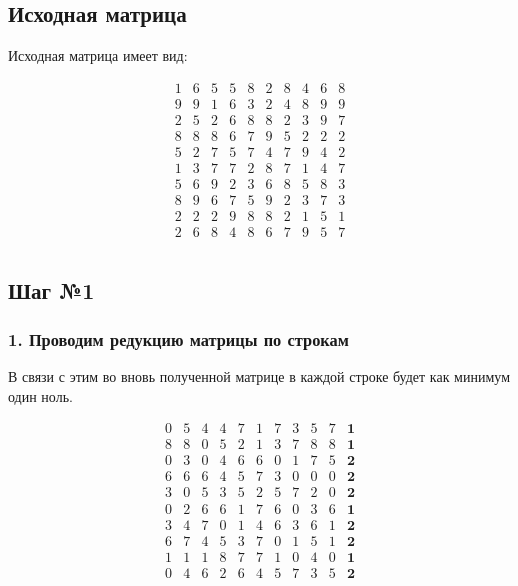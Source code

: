 \documentclass[17pt]{extarticle}
\begin{document}
\subsection*{Исходная матрица}

Исходная матрица имеет вид:

\[
    \begin{array}{*{10}{c}}
        1 & 6 & 5 & 5 & 8 & 2 & 8 & 4 & 6 & 8 \\
        9 & 9 & 1 & 6 & 3 & 2 & 4 & 8 & 9 & 9 \\
        2 & 5 & 2 & 6 & 8 & 8 & 2 & 3 & 9 & 7 \\
        8 & 8 & 8 & 6 & 7 & 9 & 5 & 2 & 2 & 2 \\
        5 & 2 & 7 & 5 & 7 & 4 & 7 & 9 & 4 & 2 \\
        1 & 3 & 7 & 7 & 2 & 8 & 7 & 1 & 4 & 7 \\
        5 & 6 & 9 & 2 & 3 & 6 & 8 & 5 & 8 & 3 \\
        8 & 9 & 6 & 7 & 5 & 9 & 2 & 3 & 7 & 3 \\
        2 & 2 & 2 & 9 & 8 & 8 & 2 & 1 & 5 & 1 \\
        2 & 6 & 8 & 4 & 8 & 6 & 7 & 9 & 5 & 7 \\
    \end{array}
\]

\subsection*{Шаг №1}

\subsubsection*{1. Проводим редукцию матрицы по строкам}

В связи с этим во вновь полученной матрице в каждой строке будет как минимум один ноль.

\[
    \begin{array}{*{11}{c}}
        0 & 5 & 4 & 4 & 7 & 1 & 7 & 3 & 5 & 7 & \textbf{1} \\
        8 & 8 & 0 & 5 & 2 & 1 & 3 & 7 & 8 & 8 & \textbf{1} \\
        0 & 3 & 0 & 4 & 6 & 6 & 0 & 1 & 7 & 5 & \textbf{2} \\
        6 & 6 & 6 & 4 & 5 & 7 & 3 & 0 & 0 & 0 & \textbf{2} \\
        3 & 0 & 5 & 3 & 5 & 2 & 5 & 7 & 2 & 0 & \textbf{2} \\
        0 & 2 & 6 & 6 & 1 & 7 & 6 & 0 & 3 & 6 & \textbf{1} \\
        3 & 4 & 7 & 0 & 1 & 4 & 6 & 3 & 6 & 1 & \textbf{2} \\
        6 & 7 & 4 & 5 & 3 & 7 & 0 & 1 & 5 & 1 & \textbf{2} \\
        1 & 1 & 1 & 8 & 7 & 7 & 1 & 0 & 4 & 0 & \textbf{1} \\
        0 & 4 & 6 & 2 & 6 & 4 & 5 & 7 & 3 & 5 & \textbf{2} \\
    \end{array}
\]
\end{document}

